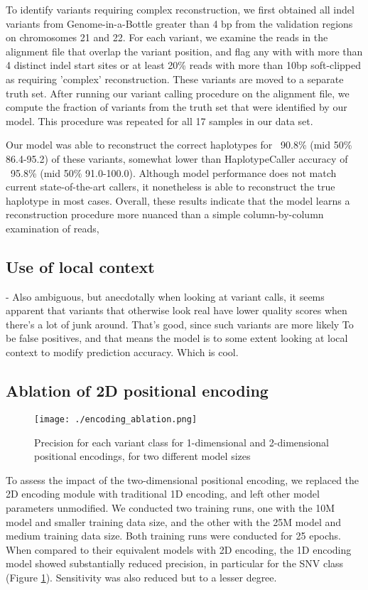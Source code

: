 \documentclass[]{article}
\begin{document}
To identify variants requiring complex reconstruction, we first obtained all indel variants from Genome-in-a-Bottle greater than 4 bp from the validation regions on chromosomes 21 and 22. For each variant, we examine the reads in the alignment file that overlap the variant position, and flag any with with more than 4 distinct indel start sites or at least 20\% reads with more than 10bp soft-clipped as requiring 'complex' reconstruction. These variants are moved to a separate truth set. After running our variant calling procedure on the alignment file, we compute the fraction of variants from the truth set that were identified by our model. This procedure was repeated for all 17 samples in our data set. 

Our model was able to reconstruct the correct haplotypes for ~90.8\% (mid 50\% 86.4-95.2) of these variants, somewhat lower than HaplotypeCaller accuracy of ~95.8\% (mid 50\% 91.0-100.0).  Although model performance does not match current state-of-the-art callers, it nonetheless is able to reconstruct the true haplotype in most cases. Overall, these results indicate that the model learns a reconstruction procedure more nuanced than a simple column-by-column examination of reads, 


\subsection{Use of local context}
 - Also ambiguous, but anecdotally when looking at variant calls, it seems apparent that variants that otherwise look real have lower quality scores when there's a lot of junk around. That's good, since such variants are more likely To
 be false positives, and that means the model is to some extent looking at local context to modify prediction accuracy. Which is cool. 

\subsection{Ablation of 2D positional encoding}

\begin{figure}[htp]
	\texttt{[image: ./encoding\_ablation.png]}
	\caption{ Precision for each variant class for 1-dimensional and 2-dimensional positional encodings, for two different model sizes }
	\label{fig:encoding_ablation}
\end{figure}

To assess the impact of the two-dimensional positional encoding, we replaced the 2D encoding module with traditional 1D encoding, and left other model parameters unmodified. We conducted two training runs, one with the 10M model and smaller training data size, and the other with the 25M model and medium training data size. Both training runs were conducted for 25 epochs. When compared to their equivalent models with 2D encoding, the 1D encoding model showed substantially reduced precision, in particular for the SNV class (Figure \ref{fig:encoding_ablation}). Sensitivity was also reduced but to a lesser degree. 
\end{document}
